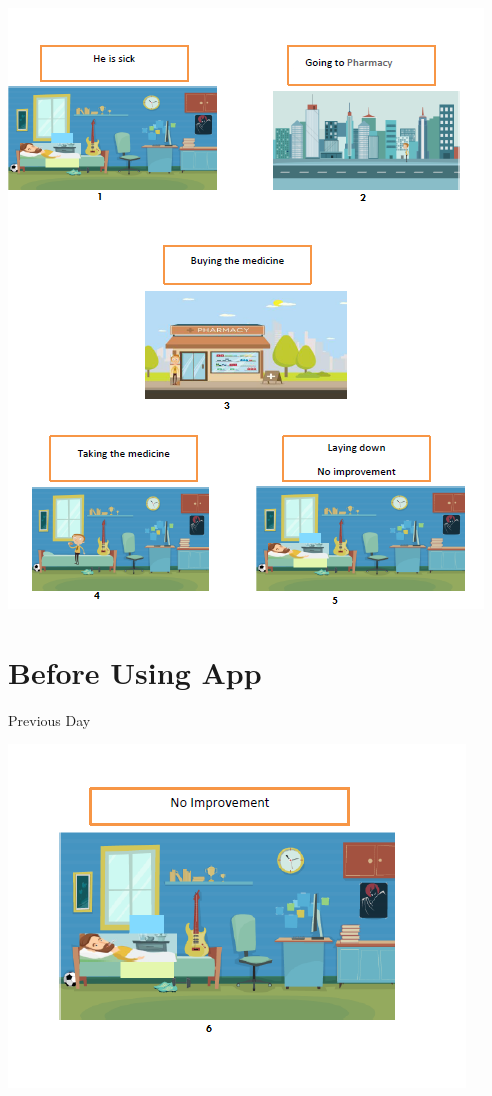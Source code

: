\documentclass[12pt]{article}
\begin{document}
\includegraphics[scale = 0.99]{BEFORE1.PNG}\\[1.0 cm]

\pagebreak

\section*{Before Using App}
Previous Day

\includegraphics[scale = 0.99]{BEFORE2.PNG}\\[1.0 cm]
\pagebreak
\end{document}
